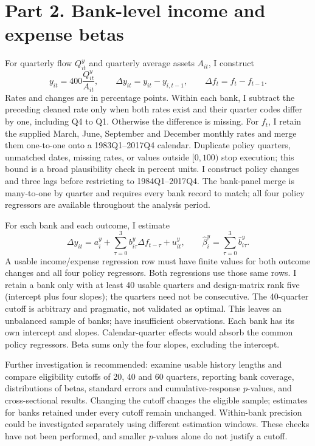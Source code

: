 \documentclass[10pt]{article}
\begin{document}
\section*{Part 2. Bank-level income and expense betas}
For quarterly flow $Q^y_{it}$ and quarterly average assets $A_{it}$, I construct
\[
 y_{it}=400\frac{Q^y_{it}}{A_{it}},\qquad
 \Delta y_{it}=y_{it}-y_{i,t-1},\qquad
 \Delta f_t=f_t-f_{t-1}.
\]
Rates and changes are in percentage points. Within each bank, I subtract the preceding cleaned rate only when both rates exist and their quarter codes differ by one, including Q4 to Q1. Otherwise the difference is missing. For $f_t$, I retain the supplied March, June, September and December monthly rates and merge them one-to-one onto a 1983Q1--2017Q4 calendar. Duplicate policy quarters, unmatched dates, missing rates, or values outside $[0,100)$ stop execution; this bound is a broad plausibility check in percent units. I construct policy changes and three lags before restricting to 1984Q1--2017Q4. The bank-panel merge is many-to-one by quarter and requires every bank record to match; all four policy regressors are available throughout the analysis period.

For each bank and each outcome, I estimate
\[
 \Delta y_{it}=a_i^y+\sum_{\tau=0}^{3}b^y_{i\tau}\Delta f_{t-\tau}+u^y_{it},
 \qquad \widehat\beta_i^y=\sum_{\tau=0}^{3}\widehat b^y_{i\tau}.
\]
A usable income/expense regression row must have finite values for both outcome changes and all four policy regressors. Both regressions use those same rows. I retain a bank only with at least 40 usable quarters and design-matrix rank five (intercept plus four slopes); the quarters need not be consecutive. The 40-quarter cutoff is arbitrary and pragmatic, not validated as optimal. This leaves an unbalanced sample of \CoreEligible{} banks; \CoreExcluded{} have insufficient observations. Each bank has its own intercept and slopes. Calendar-quarter effects would absorb the common policy regressors. Beta sums only the four slopes, excluding the intercept.

Further investigation is recommended: examine usable history lengths and compare eligibility cutoffs of 20, 40 and 60 quarters, reporting bank coverage, distributions of betas, standard errors and cumulative-response $p$-values, and cross-sectional results. Changing the cutoff changes the eligible sample; estimates for banks retained under every cutoff remain unchanged. Within-bank precision could be investigated separately using different estimation windows. These checks have not been performed, and smaller $p$-values alone do not justify a cutoff.
\end{document}
